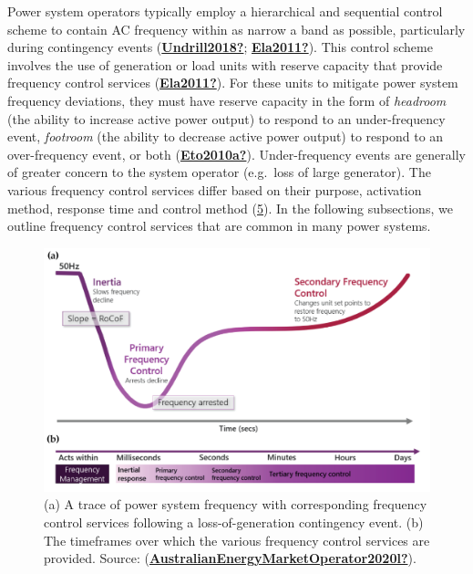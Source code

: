 \documentclass[12pt,a4paper,]{report}
\begin{document}
Power system operators typically employ a hierarchical and sequential
control scheme to contain AC frequency within as narrow a band as
possible, particularly during contingency events
(\protect\hyperlink{ref-Undrill2018}{\textbf{Undrill2018?}};
\protect\hyperlink{ref-Ela2011}{\textbf{Ela2011?}}). This control scheme
involves the use of generation or load units with reserve capacity that
provide frequency control services
(\protect\hyperlink{ref-Ela2011}{\textbf{Ela2011?}}). For these units to
mitigate power system frequency deviations, they must have reserve
capacity in the form of \emph{headroom} (the ability to increase active
power output) to respond to an under-frequency event, \emph{footroom}
(the ability to decrease active power output) to respond to an
over-frequency event, or both
(\protect\hyperlink{ref-Eto2010a}{\textbf{Eto2010a?}}). Under-frequency
events are generally of greater concern to the system operator
(e.g.~loss of large generator). The various frequency control services
differ based on their purpose, activation method, response time and
control method (\protect\hyperlink{fig:freq_control}{5}). In the
following subsections, we outline frequency control services that are
common in many power systems.

\begin{figure}
\hypertarget{fig:freq_control}{%
\centering
\includegraphics{source/figures/freq_control-03.png}
\caption{(a) A trace of power system frequency with corresponding
frequency control services following a loss-of-generation contingency
event. (b) The timeframes over which the various frequency control
services are provided. Source:
(\protect\hyperlink{ref-AustralianEnergyMarketOperator2020l}{\textbf{AustralianEnergyMarketOperator2020l?}}).}\label{fig:freq_control}
}
\end{figure}
\end{document}
